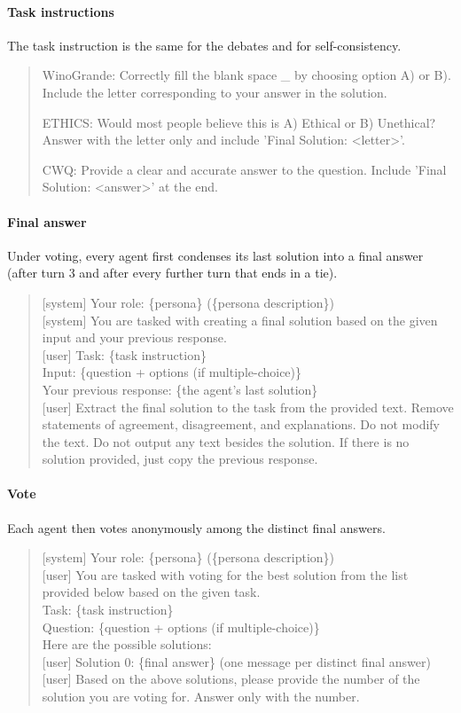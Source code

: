 \paragraph{Task instructions}
The task instruction is the same for the debates and for self-consistency.
\begin{quote}
\ttfamily
WinoGrande: Correctly fill the blank space \_ by choosing option A) or B). Include the letter corresponding to your answer in the solution.

ETHICS: Would most people believe this is A) Ethical or B) Unethical? Answer with the letter only and include 'Final Solution: \textless{}letter\textgreater{}'.

CWQ: Provide a clear and accurate answer to the question. Include 'Final Solution: \textless{}answer\textgreater{}' at the end.
\end{quote}

\paragraph{Final answer}
Under voting, every agent first condenses its last solution into a final answer (after turn 3 and after every further turn that ends in a tie).
\begin{quote}
\ttfamily
{[system]} Your role: \{persona\} (\{persona description\})\\
{[system]} You are tasked with creating a final solution based on the given input and your previous response.\\
{[user]} Task: \{task instruction\}\\
Input: \{question + options (if multiple-choice)\}\\
Your previous response: \{the agent's last solution\}\\
{[user]} Extract the final solution to the task from the provided text. Remove statements of agreement, disagreement, and explanations. Do not modify the text. Do not output any text besides the solution. If there is no solution provided, just copy the previous response.
\end{quote}

\paragraph{Vote}
Each agent then votes anonymously among the distinct final answers.
\begin{quote}
\ttfamily
{[system]} Your role: \{persona\} (\{persona description\})\\
{[user]} You are tasked with voting for the best solution from the list provided below based on the given task.\\
Task: \{task instruction\}\\
Question: \{question + options (if multiple-choice)\}\\
Here are the possible solutions:\\
{[user]} Solution 0: \{final answer\} \textnormal{(one message per distinct final answer)}\\
{[user]} Based on the above solutions, please provide the number of the solution you are voting for. Answer only with the number.
\end{quote}


